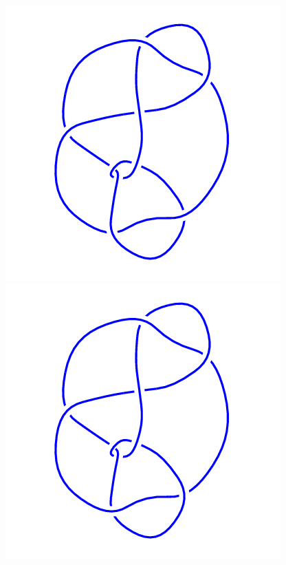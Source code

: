 \begin{figure}[H]
\begin{minipage}[b]{.18\linewidth}
	\end{minipage}
	\begin{minipage}[b]{.18\linewidth}
		\centering
		\includegraphics[width=\linewidth]{../data/9_43.png}
	\end{minipage}
	\begin{minipage}[b]{.18\linewidth}
		\centering
		\includegraphics[width=\linewidth]{../data/9_44.png}

\end{minipage}
\end{figure}
